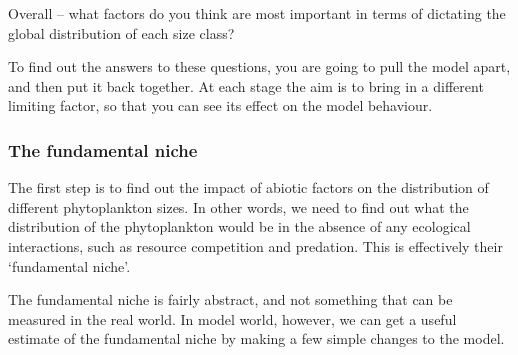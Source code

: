 \documentclass[11pt,fleqn]{book} %
\begin{document}
Overall -- what factors do you think are most important in terms of dictating the global distribution of each size class?

To find out the answers to these questions, you are going to pull the model apart, and then put it back together. At each stage the aim is to bring in a different limiting factor, so that you can see its effect on the model behaviour.


\subsubsection*{The fundamental niche}

The first step is to find out the impact of abiotic factors on the distribution of different phytoplankton sizes. In other words, we need to find out what the distribution of the phytoplankton would be in the absence of any ecological interactions, such as resource competition and predation. This is effectively their `fundamental niche'.

The fundamental niche is fairly abstract, and not something that can be measured in the real world. In model world, however, we can get a useful estimate of the fundamental niche by making a few simple changes to the model.
\end{document}
